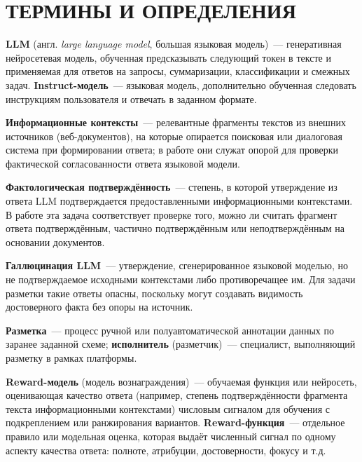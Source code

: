 \documentclass[times]{itmo-student-thesis}
\begin{document}
%
\setcounter{page}{1}%
\tableofcontents
\clearpage

\chapter*{ТЕРМИНЫ И ОПРЕДЕЛЕНИЯ}\label{chapter:terms}%
%

\noindent\textbf{LLM} (англ. \emph{large language model}, большая языковая модель)~---
генеративная нейросетевая модель, обученная предсказывать следующий токен в тексте
и применяемая для ответов на запросы, суммаризации, классификации и смежных задач.
\textbf{Instruct-модель}~--- языковая модель, дополнительно обученная следовать
инструкциям пользователя и отвечать в заданном формате.

\medskip\noindent\textbf{Информационные контексты}~--- релевантные фрагменты текстов
из внешних источников (веб-документов), на которые опирается поисковая или диалоговая
система при формировании ответа; в работе они служат опорой для проверки фактической
согласованности ответа языковой модели.

\medskip\noindent\textbf{Фактологическая подтверждённость}~--- степень,
в которой утверждение из ответа LLM подтверждается предоставленными
информационными контекстами. В работе эта задача соответствует проверке того,
можно ли считать фрагмент ответа подтверждённым, частично подтверждённым или
неподтверждённым на основании документов.

\medskip\noindent\textbf{Галлюцинация LLM}~--- утверждение, сгенерированное
языковой моделью, но не подтверждаемое исходными контекстами либо противоречащее
им. Для задачи разметки такие ответы опасны, поскольку могут создавать видимость
достоверного факта без опоры на источник.

\medskip\noindent\textbf{Разметка}~--- процесс ручной или полуавтоматической
аннотации данных по заранее заданной схеме; \textbf{исполнитель} (разметчик)~---
специалист, выполняющий разметку в рамках платформы.

\medskip\noindent\textbf{Reward-модель} (модель вознаграждения)~---
обучаемая функция или нейросеть, оценивающая качество ответа (например, степень
подтверждённости фрагмента текста информационными контекстами) числовым сигналом
для обучения с подкреплением или ранжирования вариантов.
\textbf{Reward-функция}~--- отдельное правило или модельная оценка, которая
выдаёт численный сигнал по одному аспекту качества ответа: полноте, атрибуции,
достоверности, фокусу и т.д.
\end{document}
